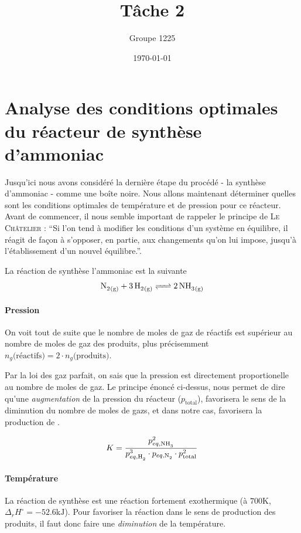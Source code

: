 \documentclass[a4paper, oneside, 12pt]{article}
\title{Tâche 2}
\author{Groupe 1225}
\date{\today}
\begin{document}
\maketitle

\section{Analyse des conditions optimales du réacteur de synthèse d'ammoniac}

Jusqu'ici nous avons considéré la dernière étape du procédé - la synthèse d'ammoniac -
comme une bo\^ite noire. Nous allons maintenant déterminer quelles sont les conditions 
optimales de température et de pression pour ce réacteur. 
Avant de commencer, il nous semble important de rappeler le principe 
de \textsc{Le Ch\^atelier} : \enquote{Si l'on tend à modifier les conditions d'un système en équilibre, 
il réagit de façon à s'opposer, en partie, aux changements qu'on lui impose, 
jusqu'à l'établissement d'un nouvel équilibre.}. \cite{chatelier}

La réaction de synthèse l'ammoniac est la suivante
\[\ce{N2_{(g)} + 3H2_{(g)} <=> 2NH3_{(g)} } \]

\paragraph{Pression}

On voit tout de suite que le nombre de moles de gaz de réactifs est supérieur 
au nombre de moles de gaz des produits, 
plus précisemment $n_{g}\text{(réactifs)} = 2 \cdot n_{g}\text{(produits)}$.

Par la loi des gaz parfait, on sais que la pression est directement proportionelle 
au nombre de moles de gaz. Le principe énoncé ci-dessus, 
nous permet de dire qu'une \emph{augmentation} de la pression du réacteur ($p_{\text{total}}$),
favorisera le sens de la diminution du nombre de moles de gazs, 
et dans notre cas, favorisera la production de .

\[
K = \frac{p_{eq,\ce{NH3}}^2}{p_{eq,\ce{H2}}^3 \cdot p_{eq,\ce{N2}} \cdot p_{\text{total}}^2}
\]
\paragraph{Température}

La réaction de synthèse est une réaction fortement exothermique 
(à $700\si{\kelvin}$, $\Delta_r H^{\circ} = -52.6\si{\kilo\joule}$).
Pour favoriser la réaction dans le sens de production des produits,
il faut donc faire une \emph{diminution} de la température.
\end{document}
